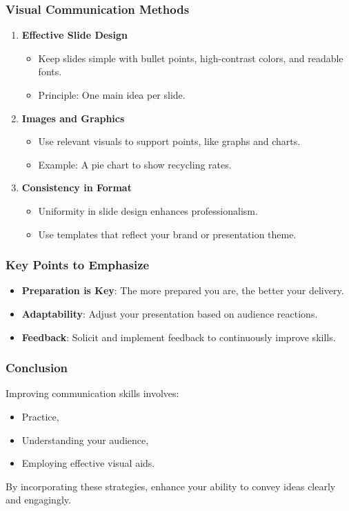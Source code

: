 \documentclass[aspectratio=169]{beamer}
\begin{document}
\begin{frame}[fragile]
    \frametitle{Visual Communication Methods}
    \begin{enumerate}
        \item \textbf{Effective Slide Design}
            \begin{itemize}
                \item Keep slides simple with bullet points, high-contrast colors, and readable fonts.
                \item Principle: One main idea per slide.
            \end{itemize}
        \item \textbf{Images and Graphics}
            \begin{itemize}
                \item Use relevant visuals to support points, like graphs and charts.
                \item Example: A pie chart to show recycling rates.
            \end{itemize}
        \item \textbf{Consistency in Format}
            \begin{itemize}
                \item Uniformity in slide design enhances professionalism.
                \item Use templates that reflect your brand or presentation theme.
            \end{itemize}
    \end{enumerate}
\end{frame}

\begin{frame}[fragile]
    \frametitle{Key Points to Emphasize}
    \begin{itemize}
        \item \textbf{Preparation is Key}:
        The more prepared you are, the better your delivery.
        \item \textbf{Adaptability}:
        Adjust your presentation based on audience reactions.
        \item \textbf{Feedback}:
        Solicit and implement feedback to continuously improve skills.
    \end{itemize}
\end{frame}

\begin{frame}[fragile]
    \frametitle{Conclusion}
    Improving communication skills involves:
    \begin{itemize}
        \item Practice,
        \item Understanding your audience,
        \item Employing effective visual aids.
    \end{itemize}
    By incorporating these strategies, enhance your ability to convey ideas clearly and engagingly.
\end{frame}
\end{document}
